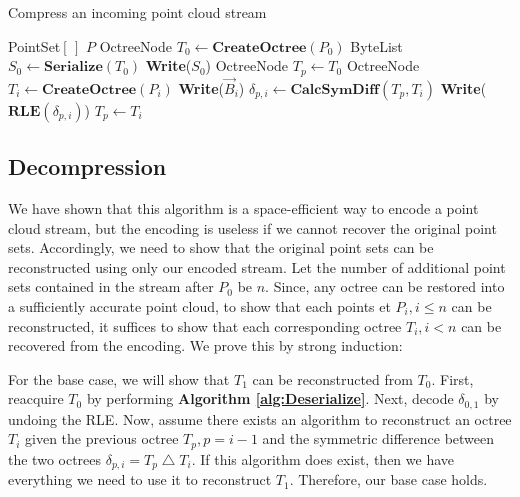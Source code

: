 \documentclass[twoside,twocolumn]{article}
\newcommand{\symdiff}{\ensuremath{\bigtriangleup}}
\begin{document}
\begin{algorithm}[h]
\small
\caption{Compress an incoming point cloud stream}
\label{alg:Stream Compression}
\begin{algorithmic}[1]
 {PointSet$[\,]$ $P$}
  \State OctreeNode $T_0 \gets \mathbf{CreateOctree}(P_0)$
  \State ByteList $S_0 \gets \mathbf{Serialize}(T_0)$
  \State \textbf{Write}($S_0$)
  \State OctreeNode $T_p \gets T_0$
   
    \State OctreeNode $T_i \gets \mathbf{CreateOctree}(P_i)$
    \State \textbf{Write}($\vec{B}_i$)
    \State $\delta_{p,i} \gets \mathbf{CalcSymDiff}(T_p, T_i)$
    \State \textbf{Write}($\mathbf{RLE}(\delta_{p,i})$)
    \State $T_p \gets T_i$
  \EndFor
\EndProcedure
\Statex
\end{algorithmic}
\vspace{-0.4cm}
\end{algorithm}


\subsection{Decompression} \label{sec:Decompression}

We have shown that this algorithm is a space-efficient way to encode a point cloud stream, but the encoding
is useless if we cannot recover the original point sets. Accordingly, we need to show that the original
point sets can be reconstructed using only our encoded stream. Let the number of additional point sets
contained in the stream after $P_0$ be $n$. Since, any octree can be restored into a sufficiently
accurate point cloud, to show that each points et $P_i, i \leq n$ can be reconstructed, it suffices to show
that each corresponding octree $T_i, i < n$ can be recovered from the encoding.
We prove this by strong induction:

For the base case, we will show that $T_1$ can be reconstructed from $T_0$. First, reacquire $T_0$ by
performing \textbf{Algorithm \ref{alg:Deserialize}}. Next, decode $\delta_{0,1}$ by undoing the RLE.
Now, assume there exists an algorithm to reconstruct an octree $T_i$ given the previous octree
$T_p, p = i - 1$ and the symmetric difference between the two octrees $\delta_{p,i} = T_p \symdiff T_i$.
If this algorithm does exist, then we have everything we need to use it to reconstruct $T_1$. Therefore,
our base case holds.
\end{document}
